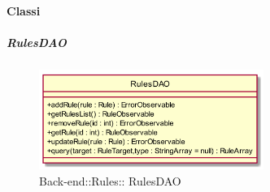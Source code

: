 \paragraph{Classi}
\hypertarget{ RulesDAO_label}{\subparagraph{ RulesDAO}}
\begin{figure}[h]
	\centering
	\includegraphics[width=0.65\textwidth,height=\textheight,keepaspectratio]{images/ClassRulesDAO.png}
	\caption{Back-end::Rules:: RulesDAO}
\end{figure}
